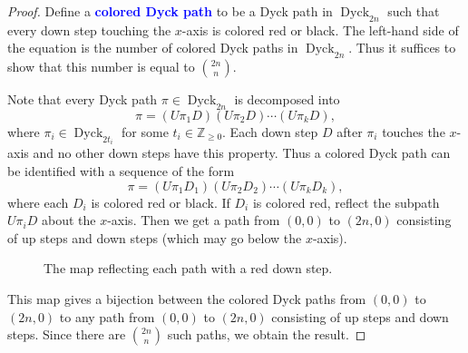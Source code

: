 \documentclass[oneside]{book}
\numberwithin{equation}{section}
\theoremstyle{definition}
\newcommand{\ZZ}{\mathbb{Z}}
\newcommand{\Dyck}{\operatorname{Dyck}}
\renewcommand\emph[1]{\textcolor{blue}{\bf #1}}
\begin{document}
  \begin{proof}
    Define a \emph{colored Dyck path} to be a Dyck path in
    \( \Dyck_{2n} \) such that every down step touching the
    \( x \)-axis is colored red or black. The left-hand side of the
    equation is the number of colored Dyck paths in \( \Dyck_{2n} \).
    Thus it suffices to show that this number is equal to
    \( \binom{2n}{n} \).

    Note that every Dyck path \( \pi\in \Dyck_{2n} \) is decomposed into
    \[
      \pi = (U\pi_1 D) (U \pi_2 D) \cdots (U\pi_k D),
    \]
    where \( \pi_i\in \Dyck_{2t_i} \) for some
    \( t_i\in \ZZ_{\ge0} \). Each down step \( D \) after \( \pi_i \)
    touches the \( x \)-axis and no other down steps have this
    property. Thus a colored Dyck path
    can be identified with a sequence of the form
    \[
      \pi = (U\pi_1 D_1) (U \pi_2 D_2) \cdots (U\pi_k D_k),
    \]
    where each \( D_i \) is colored red or black. If \( D_i \) is
    colored red, reflect the subpath \( U\pi_iD \) about the
    \( x \)-axis. Then we get a path from \( (0,0) \) to \( (2n,0) \)
    consisting of up steps and down steps (which may go below the
    \( x \)-axis).

    \begin{figure}
      \centering

      \caption{The map reflecting each path with a red down step.}
      \label{fig:reflect}
    \end{figure}


    This map gives a bijection between the colored Dyck paths from
    \( (0,0) \) to \( (2n,0) \) to any path from \( (0,0) \) to
    \( (2n,0) \) consisting of up steps and down steps. Since there
    are \( \binom{2n}{n} \) such paths, we obtain the result.
  \end{proof}
  
\end{document}
